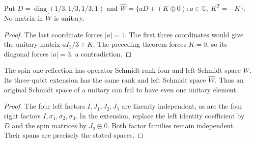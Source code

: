 \begin{lemma}
    \label{thm:mpu_qubit_unitary_space_obstruction}
    \leanok
    Put $D=\operatorname{diag}(1/3,1/3,1/3,1)$ and
    $\widehat W=\{aD+(K\oplus0):a\in\mathbb C,\ K^T=-K\}$.
    No matrix in $\widehat W$ is unitary.
\end{lemma}
\begin{proof}\leanok
    The last coordinate forces $|a|=1$.
    The first three coordinates would give the unitary matrix
    $aI_3/3+K$. The preceding theorem forces $K=0$, so its diagonal
    forces $|a|=3$, a contradiction.
\end{proof}

\begin{lemma}
    \label{thm:mpu_spin_one_schmidt_obstruction}
    The spin-one reflection has operator Schmidt rank four and left
    Schmidt space $W$. Its three-qubit extension has the same rank
    and left Schmidt space $\widehat W$.
    Thus an original Schmidt space of a unitary can fail to have
    even one unitary element.
\end{lemma}
\begin{proof}
    The four left factors $I,J_1,J_2,J_3$ are linearly independent,
    as are the four right factors $I,\sigma_1,\sigma_2,\sigma_3$.
    In the extension, replace the left identity coefficient by $D$
    and the spin matrices by $J_a\oplus0$.
    Both factor families remain independent. Their spans are precisely
    the stated spaces.
\end{proof}

